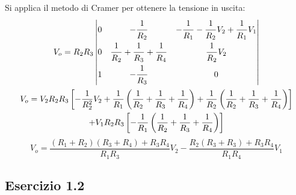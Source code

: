 \documentclass{article}
\begin{document}
Si applica il metodo di Cramer per ottenere la tensione in uscita:
\begin{gather*}
    V_o=R_2R_3\begin{vmatrix}
        0 &-\displaystyle\frac{\strut1}{\strut R_2}&-\displaystyle\frac{\strut 1}{\strut R_1}-\frac{\strut 1}{\strut R_2}V_2+\frac{\strut 1}{\strut R_1}V_1\\
        0&\displaystyle\frac{\strut 1}{\strut R_2}+\frac{\strut 1}{\strut R_3}+\frac{\strut 1}{\strut R_4}&\displaystyle\frac{\strut 1}{\strut R_2}V_2\\
        1&-\displaystyle\frac{\strut1}{\strut R_3}&0
    \end{vmatrix}\\
    V_o=\displaystyle V_2R_2R_3\left[-\frac{1}{R_2^2}V_2+\frac{1}{R_1}\left(\frac{1}{R_2}+\frac{1}{R_3}+\frac{1}{R_4}\right)+\frac{1}{R_2}\left(\frac{1}{R_2}+\frac{1}{R_3}+\frac{1}{R_4}\right)\right]\\
    +V_1R_2R_3\left[-\frac{1}{R_1}\left(\frac{1}{R_2}+\frac{1}{R_3}+\frac{1}{R_4}\right)\right]
\end{gather*}
\begin{equation}
    V_o=\displaystyle\frac{(R_1+R_2)(R_3+R_4)+R_3R_4}{R_1R_3}V_2-\frac{R_2(R_3+R_3)+R_3R_4}{R_1R_4}V_1
\end{equation}

\subsection{Esercizio 1.2}
\end{document}
